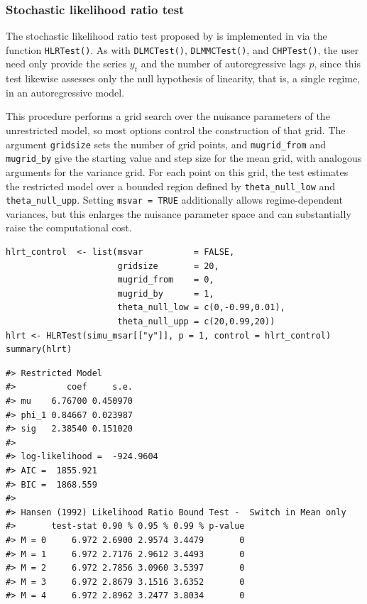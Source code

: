 \subsubsection{Stochastic likelihood ratio test}\label{stochastic-likelihood-ratio-test}

The stochastic likelihood ratio test proposed by \citet{hansen92} is implemented in  via the function \texttt{HLRTest()}. As with \texttt{DLMCTest()}, \texttt{DLMMCTest()}, and \texttt{CHPTest()}, the user need only provide the series \(y_t\) and the number of autoregressive lags \(p\), since this test likewise assesses only the null hypothesis of linearity, that is, a single regime, in an autoregressive model.

This procedure performs a grid search over the nuisance parameters of the unrestricted model, so most options control the construction of that grid. The argument \texttt{gridsize} sets the number of grid points, and \texttt{mugrid\_from} and \texttt{mugrid\_by} give the starting value and step size for the mean grid, with analogous arguments for the variance grid. For each point on this grid, the test estimates the restricted model over a bounded region defined by \texttt{theta\_null\_low} and \texttt{theta\_null\_upp}. Setting \texttt{msvar\ =\ TRUE} additionally allows regime-dependent variances, but this enlarges the nuisance parameter space and can substantially raise the computational cost.

\begin{verbatim}
hlrt_control  <- list(msvar          = FALSE,
                      gridsize       = 20,
                      mugrid_from    = 0,
                      mugrid_by      = 1,
                      theta_null_low = c(0,-0.99,0.01),
                      theta_null_upp = c(20,0.99,20))
hlrt <- HLRTest(simu_msar[["y"]], p = 1, control = hlrt_control)
summary(hlrt)
\end{verbatim}

\begin{verbatim}
#> Restricted Model
#>          coef     s.e.
#> mu    6.76700 0.450970
#> phi_1 0.84667 0.023987
#> sig   2.38540 0.151020
#> 
#> log-likelihood =  -924.9604
#> AIC =  1855.921
#> BIC =  1868.559
#> 
#> Hansen (1992) Likelihood Ratio Bound Test -  Switch in Mean only
#>       test-stat 0.90 % 0.95 % 0.99 % p-value
#> M = 0     6.972 2.6900 2.9574 3.4479       0
#> M = 1     6.972 2.7176 2.9612 3.4493       0
#> M = 2     6.972 2.7856 3.0960 3.5397       0
#> M = 3     6.972 2.8679 3.1516 3.6352       0
#> M = 4     6.972 2.8962 3.2477 3.8034       0
\end{verbatim}

